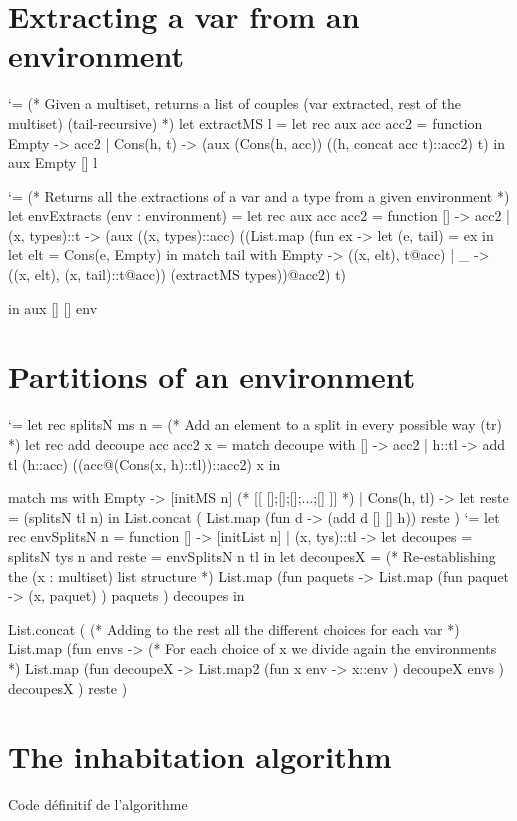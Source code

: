 \documentclass{article}
\let\origlstlisting=\lstlisting
\let\endoriglstlisting=\endlstlisting
\renewenvironment{lstlisting}
{\mathcode`\-=\hyphenmathcode
    \everymath{}\mathsurround=0pt\origlstlisting}
{\endoriglstlisting}
\begin{document}
\newpage
\appendix
\section{Extracting a var from an environment}
\label{a_extract}
\begin{lstlisting}
(* Given a multiset, returns a list of couples
(var extracted, rest of the multiset) (tail-recursive) *)
let extractMS l =
  let rec aux acc acc2 = function
    Empty -> acc2
    | Cons(h, t) -> 
  (aux (Cons(h, acc)) ((h, concat acc t)::acc2) t)
in aux Empty [] l
\end{lstlisting}


\begin{lstlisting}
(* Returns all the extractions of a var and a type 
from a given  environment *)
let envExtracts (env : environment) = 
  let rec aux acc acc2 = function
    [] -> acc2
    | (x, types)::t -> 
        (aux ((x, types)::acc) ((List.map (fun ex -> 
    let (e, tail) = ex in 
    let elt = Cons(e, Empty) in 
    match tail with
      Empty -> ((x, elt), t@acc)
      | _ -> 
((x, elt), (x, tail)::t@acc)) (extractMS types))@acc2) t) 

  in aux [] [] env
\end{lstlisting}

\newpage
\section{Partitions of an environment}
\label {a_part}
\begin{lstlisting}
let rec splitsN ms n = 
  (* Add an element to a split in every possible way (tr) *)
  let rec add decoupe acc acc2 x = match decoupe with 
    [] -> acc2
    | h::tl -> 
        add tl (h::acc) ((acc@(Cons(x, h)::tl))::acc2) x
  in
   
  match ms with
    Empty -> [initMS n] (* [[ [];[];[];...;[] ]] *)
    | Cons(h, tl) -> let reste = (splitsN tl n) in
       List.concat (
         List.map (fun d ->  (add d [] [] h)) reste
       )
\end{lstlisting}
\begin{lstlisting}
let rec envSplitsN n = function
  [] -> [initList n]
  | (x, tys)::tl -> let decoupes = splitsN tys n 
                       and reste = envSplitsN n tl in
    let decoupesX = 
      (* Re-establishing 
          the (x : multiset) list structure *)
      List.map (fun paquets -> 
        List.map (fun paquet -> 
            (x, paquet)
        ) paquets
      ) decoupes in
            
    List.concat (
      (* Adding to the rest all the different
          choices for each var *)
      List.map (fun envs -> 
        (* For each choice of x 
            we divide again the environments *)
        List.map (fun decoupeX -> 
          List.map2 (fun x env -> 
            x::env
          ) decoupeX envs
        ) decoupesX
      ) reste
    )
\end{lstlisting}

\newpage
\section{The inhabitation algorithm}
Code définitif de l'algorithme
\end{document}
